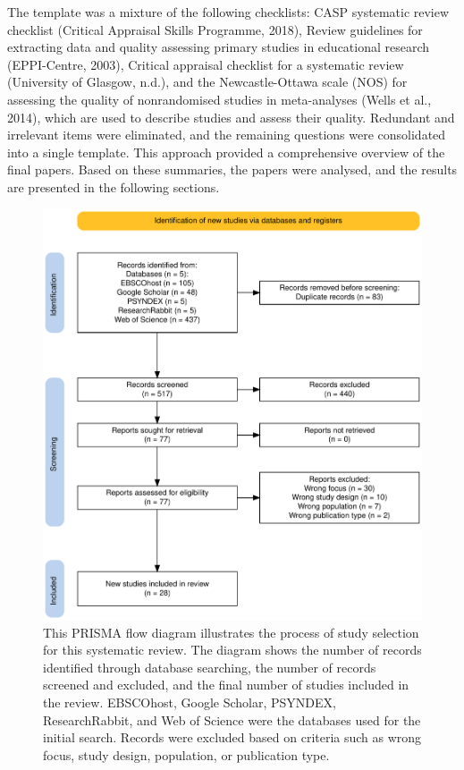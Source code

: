 \documentclass[
  stu, a4paper,floatsintext]{apa7}
\begin{document}
The template was a mixture of the following checklists: CASP systematic review checklist (Critical Appraisal Skills Programme, 2018), Review guidelines for extracting data and quality assessing primary studies in educational research (EPPI-Centre, 2003), Critical appraisal checklist for a systematic review (University of Glasgow, n.d.), and the Newcastle-Ottawa scale (NOS) for assessing the quality of nonrandomised studies in meta-analyses (Wells et al., 2014), which are used to describe studies and assess their quality.
Redundant and irrelevant items were eliminated, and the remaining questions were consolidated into a single template.
This approach provided a comprehensive overview of the final papers.
Based on these summaries, the papers were analysed, and the results are presented in the following sections.

\begin{figure}
\centering
\includegraphics{files/prisma.pdf}
\caption{\label{fig:prisma}This PRISMA flow diagram illustrates the process of study selection for this systematic review. The diagram shows the number of records identified through database searching, the number of records screened and excluded, and the final number of studies included in the review. EBSCOhost, Google Scholar, PSYNDEX, ResearchRabbit, and Web of Science were the databases used for the initial search. Records were excluded based on criteria such as wrong focus, study design, population, or publication type.}
\end{figure}
\end{document}
